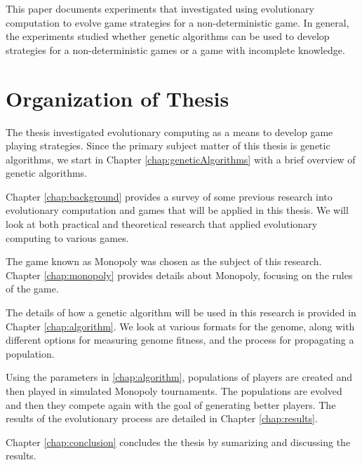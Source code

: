 This paper documents experiments that investigated using evolutionary
computation to evolve game strategies for a non-deterministic game. In general,
the experiments studied whether genetic algorithms can be used to develop
strategies for a non-deterministic games or a game with incomplete knowledge.

\section{Organization of Thesis}

The thesis investigated evolutionary computing as a means to develop game
playing strategies. Since the primary subject matter of this thesis is genetic
algorithms, we start in Chapter \ref{chap:geneticAlgorithms} with a brief
overview of genetic algorithms.

Chapter \ref{chap:background} provides a survey of some previous research into
evolutionary computation and games that will be applied in this thesis. We will
look at both practical and theoretical research that applied evolutionary
computing to various games.

The game known as Monopoly was chosen as the subject of this research. Chapter
\ref{chap:monopoly} provides details about Monopoly, focusing on the rules of
the game.

The details of how a genetic algorithm will be used in this research is provided
in Chapter \ref{chap:algorithm}. We look at various formats for the genome,
along with different options for measuring genome fitness, and the process for
propagating a population.

Using the parameters in \ref{chap:algorithm}, populations of players are created
and then played in simulated Monopoly tournaments. The populations are evolved
and then they compete again with the goal of generating better players. The
results of the evolutionary process are detailed in Chapter \ref{chap:results}.

Chapter \ref{chap:conclusion} concludes the thesis by sumarizing and discussing
the results.
